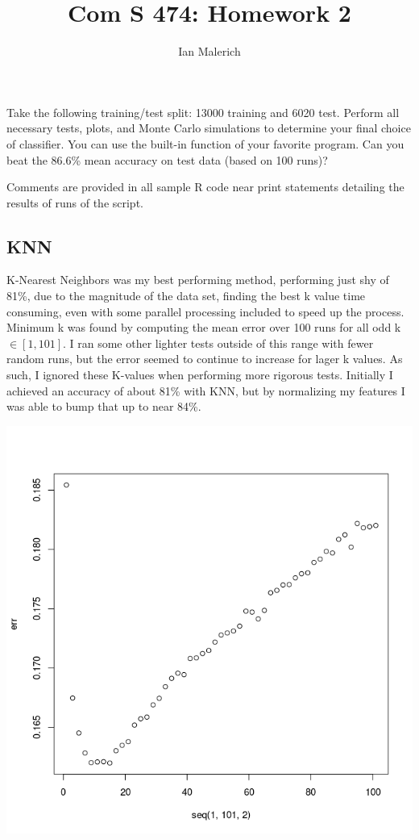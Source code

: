 \documentclass{jhwhw}
\author{Ian Malerich}
\title{Com S 474: Homework 2}
\begin{document}
\problem{}

    Take the following training/test split: 13000 training and 6020 test. Perform all
    necessary tests, plots, and Monte Carlo simulations to determine your final choice of classifier.
    You can use the built-in function of your favorite program. Can you beat the 86.6\% mean accuracy
    on test data (based on 100 runs)?

\solution

    \raggedright

    Comments are provided in all sample R code near print statements detailing
    the results of runs of the script. \\

    \subsection*{KNN}
    K-Nearest Neighbors was my best performing method, performing just shy of 81\%,
    due to the magnitude of the data set, finding the best k value time consuming,
    even with some parallel processing included to speed up the process.
    Minimum k was found by computing the mean error over 100 runs for all odd k 
    $\in [1,101]$. I ran some other lighter tests outside of this range with
    fewer random runs, but the error seemed to continue to increase for 
    lager k values. As such, I ignored these K-values when performing
    more rigorous tests.
    \bigbreak
    Initially I achieved an accuracy of about 81\% with KNN, but by normalizing my
    features I was able to bump that up to near 84\%.
    \begin{center}
	\includegraphics[scale=0.45]{mink}
    \end{center}
    \inputminted[linenos,frame=lines,framesep=2mm]{R}{knn.R}
\end{document}

